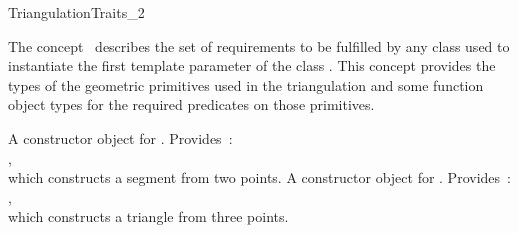 

\begin{ccRefConcept}{TriangulationTraits_2}


\ccDefinition
  
The concept \ccRefName\ describes 
 the set of requirements to be
fulfilled
by any class used to instantiate the first template parameter of the class 
.
This concept provides the types of the geometric primitives used in the
triangulation and some function object types
for the required predicates on those primitives.

\ccTypes
{}
\ccGlue
{}
\ccGlue
{}

 {A constructor object for
. Provides~: \\
, \\ 
which constructs a  segment from two points.}
\ccGlue
{} {A constructor object for
. Provides~: \\
, \\
which constructs a triangle from three points.}


\end{ccRefConcept}
